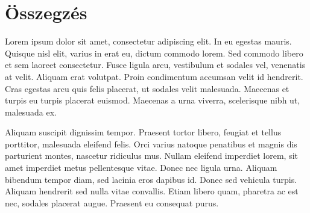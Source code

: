 \chapter{Összegzés} %
\label{ch:developer}

Lorem ipsum dolor sit amet, consectetur adipiscing elit. In eu egestas mauris. Quisque nisl elit, varius in erat eu, dictum commodo lorem. Sed commodo libero et sem laoreet consectetur. Fusce ligula arcu, vestibulum et sodales vel, venenatis at velit. Aliquam erat volutpat. Proin condimentum accumsan velit id hendrerit. Cras egestas arcu quis felis placerat, ut sodales velit malesuada. Maecenas et turpis eu turpis placerat euismod. Maecenas a urna viverra, scelerisque nibh ut, malesuada ex.

Aliquam suscipit dignissim tempor. Praesent tortor libero, feugiat et tellus porttitor, malesuada eleifend felis. Orci varius natoque penatibus et magnis dis parturient montes, nascetur ridiculus mus. Nullam eleifend imperdiet lorem, sit amet imperdiet metus pellentesque vitae. Donec nec ligula urna. Aliquam bibendum tempor diam, sed lacinia eros dapibus id. Donec sed vehicula turpis. Aliquam hendrerit sed nulla vitae convallis. Etiam libero quam, pharetra ac est nec, sodales placerat augue. Praesent eu consequat purus.
